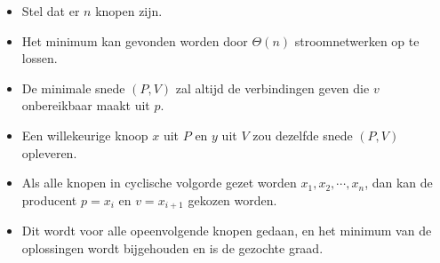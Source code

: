 \begin{itemize}
    \begin{itemize}
        \item Stel dat er $n$ knopen zijn.
        \item Het minimum kan gevonden worden door $\Theta(n)$ stroomnetwerken op te lossen.
        \item De minimale snede $(P, V)$ zal altijd de verbindingen geven die $v$ onbereikbaar maakt uit $p$.
        \item Een willekeurige knoop $x$ uit $P$ en $y$ uit $V$ zou dezelfde snede $(P, V)$ opleveren.
        \item Als alle knopen in cyclische volgorde gezet worden $x_1, x_2, \cdots, x_n$, dan kan de producent  $p = x_i$ en $v = x_{i + 1} $ gekozen worden.
        \item Dit wordt voor alle opeenvolgende knopen gedaan, en het minimum van de oplossingen wordt bijgehouden en is de gezochte graad.
    \end{itemize}
\end{itemize}